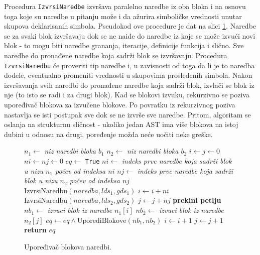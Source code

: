 Procedura \texttt{IzvrsiNaredbe} izvršava paralelno naredbe iz oba bloka i na osnovu toga koje su naredbe u pitanju može i da ažurira simboličke vrednosti unutar skupova deklarisanih simbola. Pseudokod ove procedure je dat na slici \ref{fig:ComparisonAlgorithmBlocksPseudo1}. Naredbe se za svaki blok izvršavaju dok se ne naiđe do naredbe iz koje se može izvući novi blok - to mogu biti naredbe grananja, iteracije, definicije funkcija i slično. Sve naredbe do pronađene naredbe koja sadrži blok se izvršavaju. Procedura \texttt{IzvrsiNaredbu} će proveriti tip naredbe i, u zavisnosti od toga da li je to naredba dodele, eventualno promeniti vrednosti u skupovima prosleđenih simbola. Nakon izvršavanja svih naredbi do pronađene naredbe koja sadrži blok, izvlači se blok iz nje (to isto se radi i za drugi blok). Kad se blokovi izvuku, rekurzivno se poziva upoređivač blokova za izvučene blokove. Po povratku iz rekurzivnog poziva nastavlja se isti postupak sve dok se ne izvrše sve naredbe. Pritom, algoritam se oslanja na strukturnu sličnost - ukoliko jedan AST ima više blokova na istoj dubini u odnosu na drugi, poređenje možda neće uočiti neke greške.

\begin{figure}[!h]
\begin{algorithmic}[1]
\State $n_1 \gets $ \emph{niz naredbi bloka $b_1$} 
\State $n_2 \gets $ \emph{niz naredbi bloka $b_2$}
\State $i \gets j \gets 0$
\State $ni \gets nj \gets 0$
\State $eq \gets $ \texttt{True}
    \State $ni \gets $ \emph{indeks prve naredbe koja sadrži blok u nizu $n_1$ počev od indeksa $ni$}
    \State $nj \gets $ \emph{indeks prve naredbe koja sadrži blok u nizu $n_2$ počev od indeksa $nj$}
        \State $\text{IzvrsiNaredbu}(naredba, lds_1, gds_1)$
    \EndFor
    \State $i \gets i + ni$
        \State $\text{IzvrsiNaredbu}(naredba, lds_2, gds_2)$
    \EndFor
    \State $j \gets j + nj$
        \State \textbf{prekini petlju}
    \EndIf
    \State $nb_1 \gets $ \emph{izvuci blok iz naredbe $n_1[i]$}
    \State $nb_2 \gets $ \emph{izvuci blok iz naredbe $n_2[j]$}
    \State $eq \gets eq \wedge \text{UporediBlokove}(nb_1, nb_2)$
    \State $i \gets i + 1$
    \State $j \gets j + 1$
\EndWhile
\State \textbf{return} $eq$
\EndProcedure
\end{algorithmic}
\caption{Upoređivač blokova naredbi.}
\label{fig:ComparisonAlgorithmBlocksPseudo1}
\end{figure}
